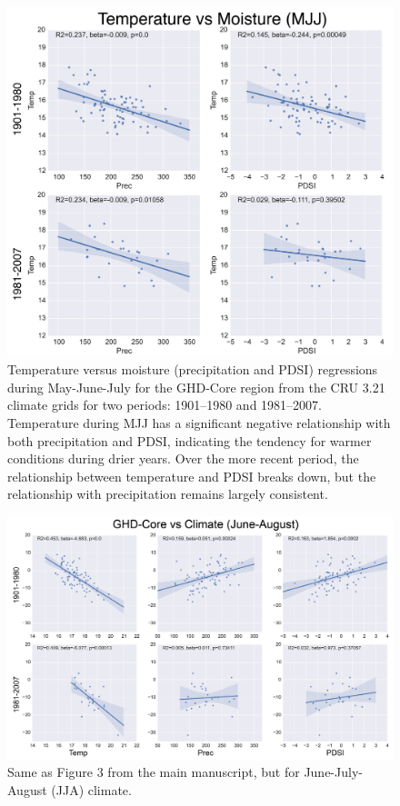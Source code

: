 \documentclass[12pt]{article}
\begin{document}
\begin{figure}
\center
\includegraphics[width=1.0\columnwidth,scale=2]{SUPP_fig_12_temp_vs_moist_MJJ.png}
\caption{Temperature versus moisture (precipitation and PDSI) regressions during May-June-July for the GHD-Core region from the CRU 3.21 climate grids for two periods: 1901--1980 and 1981--2007. Temperature during MJJ has a significant negative relationship with both precipitation and PDSI, indicating the tendency for warmer conditions during drier years. Over the more recent period, the relationship between temperature and PDSI breaks down, but the relationship with precipitation remains largely consistent.}
\end{figure}

\begin{figure}
\center
\includegraphics[width=1.0\columnwidth,scale=2]{SUPP_fig_13_JJA_clim_regplots.png}
\caption{Same as Figure 3 from the main manuscript, but for June-July-August (JJA) climate.}
\end{figure}
\end{document}

